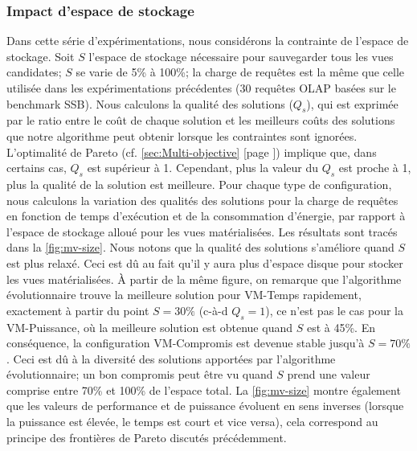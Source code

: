 \subsubsection{Impact d'espace de stockage}\label{subsubsec:ImpactStorageSpace}
Dans cette série d'expérimentations, nous considérons la contrainte de l'espace de stockage. Soit $S$ l'espace de stockage nécessaire pour sauvegarder tous les vues candidates; $S$ se varie de 5\% à 100\%; la charge de requêtes est la même que celle utilisée dans les expérimentations précédentes (30 requêtes OLAP basées sur le benchmark SSB). Nous calculons la qualité des solutions ($Q_s$), qui est exprimée par le ratio entre le coût de chaque solution et les meilleurs coûts des solutions que notre algorithme peut obtenir lorsque les contraintes sont ignorées. L'optimalité de Pareto (cf. \ref{sec:Multi-objective} [page \pageref{sec:Multi-objective}]) implique que, dans certains cas, $Q_s$ est supérieur à 1. Cependant, plus la valeur du $Q_s$ est proche à 1, plus la qualité de la solution est meilleure. Pour chaque type de configuration, nous calculons la variation des qualités des solutions pour la charge de requêtes en fonction de temps d'exécution et de la consommation d'énergie, par rapport à l'espace de stockage alloué pour les vues matérialisées. Les résultats sont tracés dans la \ref{fig:mv-size}.
Nous notons que la qualité des solutions s'améliore quand $S$ est plus relaxé. Ceci est dû au fait qu'il y aura plus d'espace disque pour stocker les vues matérialisées.
À partir de la même figure, on remarque que l'algorithme évolutionnaire trouve la meilleure solution pour VM-Temps rapidement, exactement à partir du point $S = 30\%$ (c-à-d $Q_s = 1$), ce n'est pas le cas pour la VM-Puissance, où la meilleure solution est obtenue quand $S$ est à 45\%. En conséquence, la configuration VM-Compromis est devenue stable jusqu'à $S = 70\%$. Ceci est dû à la diversité des solutions apportées par l'algorithme évolutionnaire; un bon compromis peut être vu quand $S$ prend une valeur comprise entre 70\% et 100\% de l'espace total.
La \ref{fig:mv-size} montre également que les valeurs de performance et de puissance évoluent en sens inverses (lorsque la puissance est élevée, le temps est court et vice versa), cela correspond au principe des frontières de Pareto discutés précédemment.
